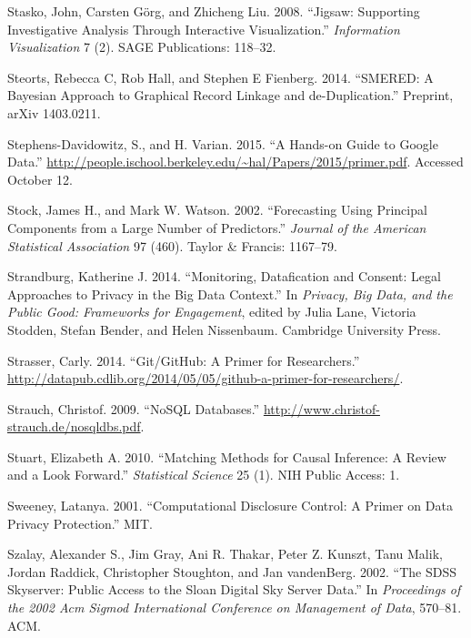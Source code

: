 \documentclass[]{krantz}
\begin{document}
\hypertarget{ref-stasko2008jigsaw}{}
Stasko, John, Carsten Görg, and Zhicheng Liu. 2008. ``Jigsaw: Supporting
Investigative Analysis Through Interactive Visualization.''
\emph{Information Visualization} 7 (2). SAGE Publications: 118--32.

\hypertarget{ref-steorts2014smered}{}
Steorts, Rebecca C, Rob Hall, and Stephen E Fienberg. 2014. ``SMERED: A
Bayesian Approach to Graphical Record Linkage and de-Duplication.''
Preprint, arXiv 1403.0211.

\hypertarget{ref-SDV2015}{}
Stephens-Davidowitz, S., and H. Varian. 2015. ``A Hands-on Guide to
Google Data.''
\url{http://people.ischool.berkeley.edu/~hal/Papers/2015/primer.pdf}.
Accessed October 12.

\hypertarget{ref-stock2002forecasting}{}
Stock, James H., and Mark W. Watson. 2002. ``Forecasting Using Principal
Components from a Large Number of Predictors.'' \emph{Journal of the
American Statistical Association} 97 (460). Taylor \& Francis: 1167--79.

\hypertarget{ref-Strandburg2014}{}
Strandburg, Katherine J. 2014. ``Monitoring, Datafication and Consent:
Legal Approaches to Privacy in the Big Data Context.'' In \emph{Privacy,
Big Data, and the Public Good: Frameworks for Engagement}, edited by
Julia Lane, Victoria Stodden, Stefan Bender, and Helen Nissenbaum.
Cambridge University Press.

\hypertarget{ref-GitResearch}{}
Strasser, Carly. 2014. ``Git/GitHub: A Primer for Researchers.''
\url{http://datapub.cdlib.org/2014/05/05/github-a-primer-for-researchers/}.

\hypertarget{ref-NoSQLdatabases}{}
Strauch, Christof. 2009. ``NoSQL Databases.''
\url{http://www.christof-strauch.de/nosqldbs.pdf}.

\hypertarget{ref-stuart2010matching}{}
Stuart, Elizabeth A. 2010. ``Matching Methods for Causal Inference: A
Review and a Look Forward.'' \emph{Statistical Science} 25 (1). NIH
Public Access: 1.

\hypertarget{ref-sweeney2001computational}{}
Sweeney, Latanya. 2001. ``Computational Disclosure Control: A Primer on
Data Privacy Protection.'' MIT.

\hypertarget{ref-szalay2002sdss}{}
Szalay, Alexander S., Jim Gray, Ani R. Thakar, Peter Z. Kunszt, Tanu
Malik, Jordan Raddick, Christopher Stoughton, and Jan vandenBerg. 2002.
``The SDSS Skyserver: Public Access to the Sloan Digital Sky Server
Data.'' In \emph{Proceedings of the 2002 Acm Sigmod International
Conference on Management of Data}, 570--81. ACM.
\end{document}
